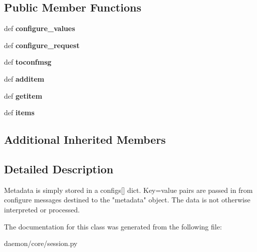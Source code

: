 \subsection*{Public Member Functions}
\begin{DoxyCompactItemize}
\item 
\hypertarget{classcore_1_1session_1_1_session_meta_data_afd5ab7af12c02cdda0d86def4a8b07b2}{def {\bfseries configure\+\_\+values}}\label{classcore_1_1session_1_1_session_meta_data_afd5ab7af12c02cdda0d86def4a8b07b2}

\item 
\hypertarget{classcore_1_1session_1_1_session_meta_data_afcd634e563b05ea81def2b336b334425}{def {\bfseries configure\+\_\+request}}\label{classcore_1_1session_1_1_session_meta_data_afcd634e563b05ea81def2b336b334425}

\item 
\hypertarget{classcore_1_1session_1_1_session_meta_data_a6f99a163d8972316529d757b65893725}{def {\bfseries toconfmsg}}\label{classcore_1_1session_1_1_session_meta_data_a6f99a163d8972316529d757b65893725}

\item 
\hypertarget{classcore_1_1session_1_1_session_meta_data_af44d838f3015549868117a16772c86db}{def {\bfseries additem}}\label{classcore_1_1session_1_1_session_meta_data_af44d838f3015549868117a16772c86db}

\item 
\hypertarget{classcore_1_1session_1_1_session_meta_data_a68c3e1b7e7dc8a93f646e028d2886231}{def {\bfseries getitem}}\label{classcore_1_1session_1_1_session_meta_data_a68c3e1b7e7dc8a93f646e028d2886231}

\item 
\hypertarget{classcore_1_1session_1_1_session_meta_data_a1cc41e14e23e08e3bb041b63dc60a80b}{def {\bfseries items}}\label{classcore_1_1session_1_1_session_meta_data_a1cc41e14e23e08e3bb041b63dc60a80b}

\end{DoxyCompactItemize}
\subsection*{Additional Inherited Members}


\subsection{Detailed Description}
\begin{DoxyVerb}Metadata is simply stored in a configs[] dict. Key=value pairs are
passed in from configure messages destined to the "metadata" object.
The data is not otherwise interpreted or processed.
\end{DoxyVerb}
 

The documentation for this class was generated from the following file\+:\begin{DoxyCompactItemize}
\item 
daemon/core/session.\+py\end{DoxyCompactItemize}
